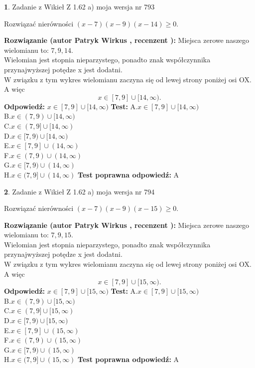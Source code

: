 \documentclass[12pt, a4paper]{article}
\theoremstyle{definition} %
\newtheorem{zad}{}
\newcommand{\zadStart}[1]{\begin{zad}#1\newline}
\newcommand{\zadStop}{\end{zad}}
\newcommand{\rozwStart}[2]{\noindent \textbf{Rozwiązanie (autor #1 , recenzent #2): }\newline}
\newcommand{\rozwStop}{\newline}
\newcommand{\odpStart}{\noindent \textbf{Odpowiedź:}\newline}
\newcommand{\odpStop}{\newline}
\newcommand{\testStart}{\noindent \textbf{Test:}\newline}
\newcommand{\testStop}{\newline}
\newcommand{\kluczStart}{\noindent \textbf{Test poprawna odpowiedź:}\newline}
\newcommand{\kluczStop}{\newline}
\begin{document}
\zadStart{Zadanie z Wikieł Z 1.62 a) moja wersja nr 793}

Rozwiązać nierówności $(x-7)(x-9)(x-14)\ge0$.
\zadStop
\rozwStart{Patryk Wirkus}{}
Miejsca zerowe naszego wielomianu to: $7, 9, 14$.\\
Wielomian jest stopnia nieparzystego, ponadto znak współczynnika przy\linebreak najwyższej potędze x jest dodatni.\\ W związku z tym wykres wielomianu zaczyna się od lewej strony poniżej osi OX. A więc $$x \in [7,9] \cup [14,\infty).$$
\rozwStop
\odpStart
$x \in [7,9] \cup [14,\infty)$
\odpStop
\testStart
A.$x \in [7,9] \cup [14,\infty)$\\
B.$x \in (7,9) \cup [14,\infty)$\\
C.$x \in (7,9] \cup [14,\infty)$\\
D.$x \in [7,9) \cup [14,\infty)$\\
E.$x \in [7,9] \cup (14,\infty)$\\
F.$x \in (7,9) \cup (14,\infty)$\\
G.$x \in [7,9) \cup (14,\infty)$\\
H.$x \in (7,9] \cup (14,\infty)$
\testStop
\kluczStart
A
\kluczStop



\zadStart{Zadanie z Wikieł Z 1.62 a) moja wersja nr 794}

Rozwiązać nierówności $(x-7)(x-9)(x-15)\ge0$.
\zadStop
\rozwStart{Patryk Wirkus}{}
Miejsca zerowe naszego wielomianu to: $7, 9, 15$.\\
Wielomian jest stopnia nieparzystego, ponadto znak współczynnika przy\linebreak najwyższej potędze x jest dodatni.\\ W związku z tym wykres wielomianu zaczyna się od lewej strony poniżej osi OX. A więc $$x \in [7,9] \cup [15,\infty).$$
\rozwStop
\odpStart
$x \in [7,9] \cup [15,\infty)$
\odpStop
\testStart
A.$x \in [7,9] \cup [15,\infty)$\\
B.$x \in (7,9) \cup [15,\infty)$\\
C.$x \in (7,9] \cup [15,\infty)$\\
D.$x \in [7,9) \cup [15,\infty)$\\
E.$x \in [7,9] \cup (15,\infty)$\\
F.$x \in (7,9) \cup (15,\infty)$\\
G.$x \in [7,9) \cup (15,\infty)$\\
H.$x \in (7,9] \cup (15,\infty)$
\testStop
\kluczStart
A
\kluczStop
\end{document}
